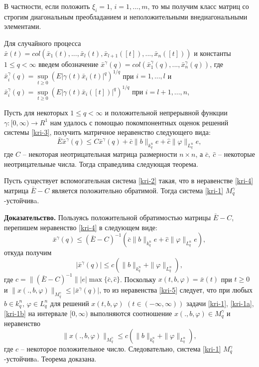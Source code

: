 В частности, если положить $\xi _i = 1$, $i = 1,...,m$, то мы
получим класс матриц со строгим диагональным преобладанием и
неположительными внедиагональными элементами.

Для случайного процесса $\bar x(t) = col(\bar x_1(t),...,\bar
x_l(t), \bar x_{l+1}([t]),...,\bar x_n([t]))$ и константы $1 \leq q
< \infty $ введем обозначение $ \bar x^\gamma (q) = col (\bar
x_1^\gamma (q),...,\bar x_n^\gamma (q))$, где $\bar x_i^\gamma (q) =
\sup \limits _{t \geq 0}\left (E|\gamma (t) \bar x_i(t)|^{q}\right
)^{1/q}$ при   $i = 1,...,l$ и $\bar x_i^\gamma (q) = \sup \limits
_{t \geq 0}\left (E|\gamma (t)\bar x_i([t])|^{q}\right )^{1/q}$ при
$i = l+1,...,n$,

Пусть для некоторых $1\le q < \infty $ и положительной непрерывной
функции $\gamma :[0, \infty) \rightarrow R^1 $ нам удалось с помощью
покомпонентных оценок решений системы \eqref{kri-3}, получить матричное
неравенство следующего вида:
\begin{equation}\label{kri-4}
\bar E\bar x^\gamma (q) \leq C\bar x^\gamma (q) + \bar
c\|b\|_{k^n_{q}}e + \hat c \|\varphi \|_{L^n_q} e,
\end{equation}
где $C$ -- некоторая неотрицательная матрица размерности $n\times
n$, а $\bar c, \ \hat c$ -- некоторые неотрицательные числа. Тогда
справедлива следующая теорема.

\begin{theorem}\label{kri-th2} Пусть существует вспомогательная система
\eqref{kri-2} такая, что в неравенстве \eqref{kri-4} матрица $\bar E - C$ является
положительно обратимой. Тогда система \eqref{kri-1} $M_q^\gamma$-устойчивa.
\end{theorem}

\textbf{ Доказательство.} Пользуясь положительной обратимостью матрицы
$\bar E - C$, перепишем неравенство \eqref{kri-4} в следующем виде:
$$
\bar x^\gamma (q) \leq (\bar E - C)^{-1}\left(\bar c\|b\|_{k^n_{q}}e
+ \hat c \|\varphi \|_{L^n_q} e \right),
$$
откуда получим
\begin{equation}\label{kri-5}
|\bar x^\gamma (q)| \leq c\left (\|b\|_{k^n_{q}}+ \|\varphi
\|_{L^n_q}\right ),
\end{equation}
где $c =\|(\bar E - C)^{-1}\||e|\max \{\bar c, \hat c\}$.
Поскольку $x(t,b,\varphi) = \bar x(t)$  при $t \geq 0$ и
$\|x(.,b,\varphi)\|_{M_q^\gamma} \leq |\bar x^\gamma (q)|$, то из
неравенства \eqref{kri-5} следует, что при любых $b \in k^n_q$, $\varphi \in
L^n_q$ для решений $x(t, b, \varphi)$ $(t \in (-\infty, \infty))$
задачи \eqref{kri-1}, \eqref{kri-1a}, \eqref{kri-1b} на интервале $[0,\infty)$ выполняются
соотношение $x(., b, \varphi) \in M_q^\gamma$ и неравенство
$$
\|x(., b, \varphi)\|_{M_q^\gamma} \le c(\|b\|_{k^n_q} + \|\varphi
\|_{L^n_q}),
$$
где $c$ -- некоторое положительное число. Следовательно,  система
\eqref{kri-1} $M_q^\gamma$-устойчивa. Теорема доказана.

